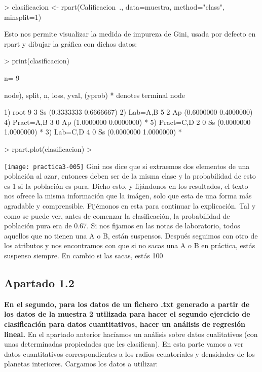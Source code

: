 \documentclass[a4paper]{article}
\begin{document}
\begin{Schunk}
\begin{Sinput}
> clasificacion <- rpart(Calificacion~., data=muestra, method="class", minsplit=1)
\end{Sinput}
\end{Schunk}
Esto nos permite visualizar la medida de impureza de Gini, usada por defecto en rpart y dibujar la gráfica con dichos datos:
\begin{Schunk}
\begin{Sinput}
> print(clasificacion)
\end{Sinput}
\begin{Soutput}
n= 9 

node), split, n, loss, yval, (yprob)
      * denotes terminal node

1) root 9 3 Ss (0.3333333 0.6666667)  
  2) Lab=A,B 5 2 Ap (0.6000000 0.4000000)  
    4) Pract=A,B 3 0 Ap (1.0000000 0.0000000) *
    5) Pract=C,D 2 0 Ss (0.0000000 1.0000000) *
  3) Lab=C,D 4 0 Ss (0.0000000 1.0000000) *
\end{Soutput}
\begin{Sinput}
> rpart.plot(clasificacion)
> 
\end{Sinput}
\end{Schunk}
\texttt{[image: practica3-005]}
Gini nos dice que si extraemos dos elementos de una población al azar, entonces deben ser de la misma clase y la probabilidad de esto es 1 si la población es pura. Dicho esto, y fijándonos en los resultados, el texto nos ofrece la misma información que la imágen, solo que esta de una forma más agradable y comprensible.
Fijémonos en esta para continuar la explicación. Tal y como se puede ver, antes de comenzar la clasificación, la probabilidad de población pura era de 0.67. Si nos fijamos en las notas de laboratorio, todos aquellos que no tienen una A o B, están suspensos. Después seguimos con otro de los atributos y nos encontramos con que si no sacas una A o B en práctica, estás suspenso siempre. En cambio si las sacas, estás 100%

\subsection{Apartado 1.2}
\textbf{En el segundo, para los datos de un fichero .txt generado a partir de los datos de la muestra 2 utilizada para hacer el segundo ejercicio de clasificación para datos cuantitativos, hacer un análisis de regresión lineal.}
En el apartado anterior hacíamos un análisis sobre datos cualitativos (con unas determinadas propiedades que les clasifican). En esta parte vamos a ver datos cuantitativos correspondientes a los radios ecuatoriales y densidades de los planetas interiores.
Cargamos los datos a utilizar:
\end{document}
